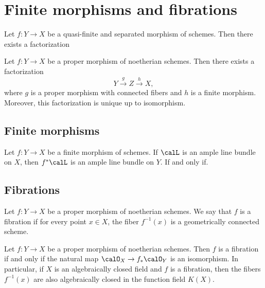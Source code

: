 \section{Finite morphisms and fibrations}

    \begin{theorem}\label{thm:Zariski_main_theorem}
        Let \(f: Y \to X\) be a quasi-finite and separated morphism of schemes.
        Then there exists a factorization
    \end{theorem}

    \begin{theorem}\label{thm:Stein_factorization}
        Let \(f: Y \to X\) be a proper morphism of noetherian schemes.
        Then there exists a factorization
        \[
            Y \xrightarrow{g} Z \xrightarrow{h} X,
        \]
        where \(g\) is a proper morphism with connected fibers and \(h\) is a finite morphism.
        Moreover, this factorization is unique up to isomorphism.
    \end{theorem}

\subsection{Finite morphisms}

    \begin{theorem}\label{thm:finite_preserve_ampleness}
        Let \(f: Y \to X\) be a finite morphism of schemes. 
        If \(\calL\) is an ample line bundle on \(X\), then \(f^*\calL\) is an ample line bundle on \(Y\).
        If and only if.
    \end{theorem}

\subsection{Fibrations}

    \begin{definition}\label{def:fibration_of_proper_morphism}
        Let \(f: Y \to X\) be a proper morphism of noetherian schemes.
        We say that \(f\) is a fibration if for every point \(x \in X\), the fiber \(f^{-1}(x)\) is a geometrically connected scheme.
    \end{definition}

    \begin{proposition}\label{prop:fibration_direct_image_of_O_Y_and_algebraically_closed_in_function_field}
        Let \(f: Y \to X\) be a proper morphism of noetherian schemes.
        Then \(f\) is a fibration if and only if the natural map \(\calO_X \to f_*\calO_Y\) is an isomorphism.
        In particular, if \(X\) is an algebraically closed field and \(f\) is a fibration, then the fibers \(f^{-1}(x)\) are also algebraically closed in the function field \(K(X)\).
    \end{proposition}

